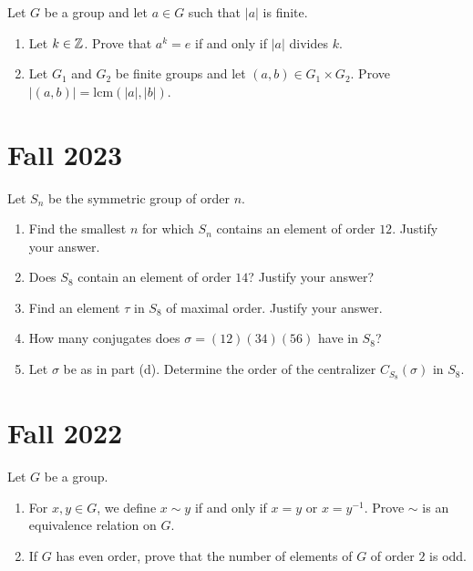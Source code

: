 \documentclass[a4paper]{article}
\begin{document}
\begin{problem}
    Let \( G \) be a group and let \( a \in G  \) such that \( | a  |  \) is finite. 
    \begin{enumerate}
        \item[(a)] Let \( k \in \mathbb{Z}  \). Prove that \( a^{k} = e  \) if and only if \( | a  |   \) divides \( k  \).
        \item[(b)] Let \( {G}_{1} \) and \( {G}_{2} \) be finite groups and let \( (a,b) \in {G}_{1} \times {G}_{2}  \). Prove \( | (a,b) |  = \text{lcm}(| a | , | b | ) \).
    \end{enumerate}
\end{problem}

\section{Fall 2023}

\begin{problem}
   Let \( {S}_{n} \) be the symmetric group of order \( n  \).   
   \begin{enumerate}
       \item[(a)] Find the smallest \( n \) for which \( {S}_{n} \) contains an element of order \( 12 \). Justify your answer. 
        \item[(b)] Does \( {S}_{8} \) contain an element of order \( 14 \)? Justify your answer?
        \item[(c)] Find an element \( \tau  \) in \( {S}_{8} \) of maximal order. Justify your answer. 
        \item[(d)] How many conjugates does \( \sigma = (12)(34)(56)  \) have in \( {S}_{8} \)?
        \item[(e)] Let \( \sigma \) be as in part (d). Determine the order of the centralizer \( {C}_{{S}_{8}}(\sigma) \) in \( {S}_{8} \).
   \end{enumerate} 
\end{problem}

\section{Fall 2022}

\begin{problem}
    Let \( G  \) be a group. 
    \begin{enumerate}
        \item[(a)] For \( x,y \in G  \), we define \( x \sim y  \) if and only if \( x = y  \) or \( x = y^{-1} \). Prove \( \sim  \) is an equivalence relation on \( G  \). 
        \item[(b)] If \( G  \) has even order, prove that the number of elements of \( G  \) of order \( 2  \) is odd.
    \end{enumerate}
\end{problem}
\end{document}
